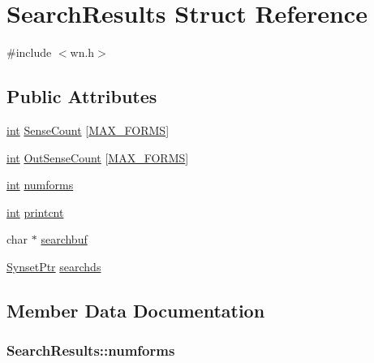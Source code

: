 \hypertarget{struct_search_results}{}\section{Search\+Results Struct Reference}
\label{struct_search_results}


{\ttfamily \#include $<$wn.\+h$>$}

\subsection*{Public Attributes}
\begin{DoxyCompactItemize}
\item 
\hyperlink{tk_8h_a83f82f76e7fed06f4c49d2db94028a6d}{int} \hyperlink{struct_search_results_aae62c7484f383b417e285aec5c970442}{Sense\+Count} \mbox{[}\hyperlink{wn_8h_a37015012ec8e5fa8eda98b5c5ba5de66}{M\+A\+X\+\_\+\+F\+O\+R\+MS}\mbox{]}
\item 
\hyperlink{tk_8h_a83f82f76e7fed06f4c49d2db94028a6d}{int} \hyperlink{struct_search_results_a2bf1ec846a76e7de779ee452b3dc1d31}{Out\+Sense\+Count} \mbox{[}\hyperlink{wn_8h_a37015012ec8e5fa8eda98b5c5ba5de66}{M\+A\+X\+\_\+\+F\+O\+R\+MS}\mbox{]}
\item 
\hyperlink{tk_8h_a83f82f76e7fed06f4c49d2db94028a6d}{int} \hyperlink{struct_search_results_a3cb1e8bcdba3c1db8d01a291fd2f0464}{numforms}
\item 
\hyperlink{tk_8h_a83f82f76e7fed06f4c49d2db94028a6d}{int} \hyperlink{struct_search_results_a58323667030ac776a25d4f58013c260e}{printcnt}
\item 
char $\ast$ \hyperlink{struct_search_results_a63f8ae7e0f22fe1fba2b8d386466e19f}{searchbuf}
\item 
\hyperlink{wn_8h_a2f65100e62667dc16b013f56bdfc697b}{Synset\+Ptr} \hyperlink{struct_search_results_ad1b692c6bc782eec6e6921f3bc098bc3}{searchds}
\end{DoxyCompactItemize}


\subsection{Member Data Documentation}
\subsubsection[{\texorpdfstring{numforms}{numforms}}]{ Search\+Results\+::numforms}\hypertarget{struct_search_results_a3cb1e8bcdba3c1db8d01a291fd2f0464}{}\label{struct_search_results_a3cb1e8bcdba3c1db8d01a291fd2f0464}

